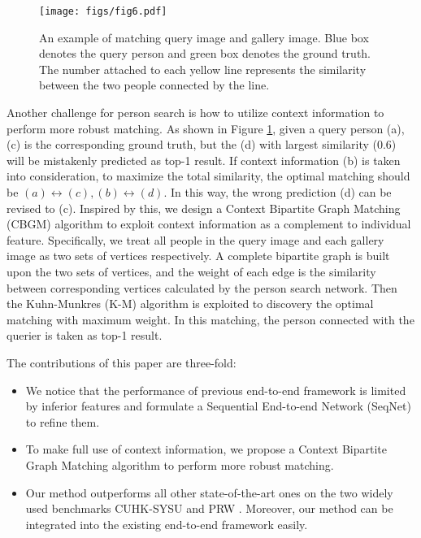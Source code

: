 \documentclass[letterpaper]{article} \usepackage{aaai21}  \usepackage{times}  \usepackage{helvet} \usepackage{courier}  \usepackage[hyphens]{url}  \usepackage{graphicx} \urlstyle{rm} \def\UrlFont{\rm}  \usepackage{natbib}  \usepackage{caption} \usepackage{multirow}
\begin{document}
\begin{figure}[t]
    \centering
    \texttt{[image: figs/fig6.pdf]}
    \caption{An example of matching query image and gallery image. Blue box denotes the query person and green box denotes the ground truth. The number attached to each yellow line represents the similarity between the two people connected by the line.}
    \label{matching_example}
\end{figure}

Another challenge for person search is how to utilize context information to perform more robust matching. As shown in Figure \ref{matching_example}, given a query person (a), (c) is the corresponding ground truth, but the (d) with largest similarity (0.6) will be mistakenly predicted as top-1 result. If context information (b) is taken into consideration, to maximize the total similarity, the optimal matching should be $(a)\leftrightarrow(c), (b)\leftrightarrow(d)$. In this way, the wrong prediction (d) can be revised to (c). Inspired by this, we design a Context Bipartite Graph Matching (CBGM) algorithm to exploit context information as a complement to individual feature. Specifically, we treat all people in the query image and each gallery image as two sets of vertices respectively. A complete bipartite graph is built upon the two sets of vertices, and the weight of each edge is the similarity between corresponding vertices calculated by the person search network. Then the Kuhn-Munkres (K-M) algorithm \cite{km-k,km-m} is exploited to discovery the optimal matching with maximum weight. In this matching, the person connected with the querier is taken as top-1 result.

The contributions of this paper are three-fold:

\begin{itemize}
    \item We notice that the performance of previous end-to-end framework is limited by inferior features and formulate a Sequential End-to-end Network (SeqNet) to refine them.
    \item To make full use of context information, we propose a Context Bipartite Graph Matching algorithm to perform more robust matching.
    \item Our method outperforms all other state-of-the-art ones on the two widely used benchmarks CUHK-SYSU \cite{oim} and PRW \cite{prw}. Moreover, our method can be integrated into the existing end-to-end framework easily.
\end{itemize}
\end{document}
